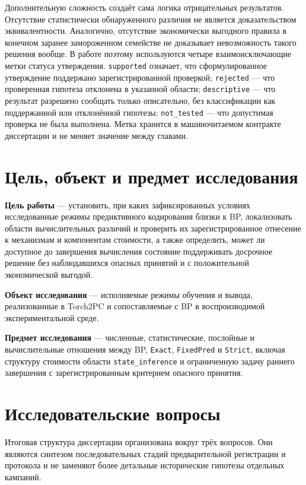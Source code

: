 Дополнительную сложность создаёт сама логика отрицательных результатов.
Отсутствие статистически обнаруженного различия не является доказательством
эквивалентности. Аналогично, отсутствие экономически выгодного правила в
конечном заранее замороженном семействе не доказывает невозможность такого
решения вообще. В работе поэтому используются четыре взаимоисключающие метки статуса
утверждения. \texttt{supported} означает, что сформулированное утверждение
поддержано зарегистрированной проверкой; \texttt{rejected} --- что проверенная
гипотеза отклонена в указанной области; \texttt{descriptive} --- что результат
разрешено сообщать только описательно, без классификации как поддержанной или
отклонённой гипотезы; \texttt{not\_tested} --- что допустимая проверка не была
выполнена. Метка хранится в машиночитаемом контракте диссертации и не меняет
значение между главами.

\section{Цель, объект и предмет исследования}

\textbf{Цель работы} --- установить, при каких зафиксированных условиях
исследованные режимы предиктивного кодирования близки к BP, локализовать
области вычислительных различий и проверить их зарегистрированное отнесение к
механизмам и компонентам стоимости, а также определить, может ли доступное до
завершения вычисления состояние поддерживать досрочное решение без наблюдавшихся
опасных принятий и с положительной экономической выгодой.

\textbf{Объект исследования} --- исполняемые режимы обучения и вывода,
реализованные в Torch2PC и сопоставляемые с BP в воспроизводимой
экспериментальной среде.

\textbf{Предмет исследования} --- численные, статистические, послойные и
вычислительные отношения между BP, \texttt{Exact}, \texttt{FixedPred} и
\texttt{Strict}, включая структуру стоимости области \texttt{state\_inference}
и ограниченную задачу раннего завершения с зарегистрированным критерием опасного принятия.

\section{Исследовательские вопросы}
\label{sec:intro-rq}

Итоговая структура диссертации организована вокруг трёх вопросов. Они являются
синтезом последовательных стадий предварительной регистрации и протокола и не
заменяют более детальные исторические гипотезы отдельных кампаний.

